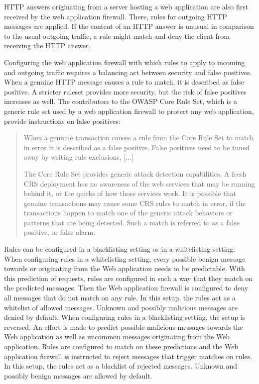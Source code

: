 HTTP answers originating from a server hosting a web application are also first received by the web application firewall.
There, rules for outgoing HTTP messages are applied.
If the content of an HTTP answer is unusual in comparison to the usual outgoing traffic, a rule might match and deny the client from receiving the HTTP answer.

Configuring the web application firewall with which rules to apply to incoming and outgoing traffic requires a balancing act between security and false positives.
When a genuine HTTP message causes a rule to match, it is described as false positive.
A stricter ruleset provides more security, but the risk of false positives increases as well.
The contributors to the OWASP Core Rule Set, which is a generic rule set used by a web application firewall to protect any web application, provide instructions on false positives:

\begin{quote}
	When a genuine transaction causes a rule from the Core Rule Set to match in error it is described as a false positive. False positives need to be tuned away by writing rule exclusions, [...]

	The Core Rule Set provides generic attack detection capabilities. A fresh CRS deployment has no awareness of the web services that may be running behind it, or the quirks of how those services work. It is possible that genuine transactions may cause some CRS rules to match in error, if the transactions happen to match one of the generic attack behaviors or patterns that are being detected. Such a match is referred to as a false positive, or false alarm. \cite{OWASP/crsfpt}
\end{quote}

Rules can be configured in a blacklisting setting or in a whitelisting setting.
When configuring rules in a whitelisting setting, every possible benign message towards or originating from the Web application needs to be predictable. 
With this prediction of requests, rules are configured in such a way that they match on the predicted messages. 
Then the Web application firewall is configured to deny all messages that do not match on any rule. 
In this setup, the rules act as a whitelist of allowed messages. Unknown and possibly malicious messages are denied by default.
When configuring rules in a blacklisting setting, the setup is reversed. 
An effort is made to predict possible malicious messages towards the Web application as well as uncommon messages originating from the Web application.
Rules are configured to match on these predictions and the Web application firewall is instructed to reject messages that trigger matches on rules. 
In this setup, the rules act as a blacklist of rejected messages. Unknown and possibly benign messages are allowed by default.

